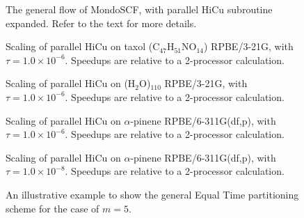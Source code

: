 \commentoutA{\documentclass[prl,aps,twocolumn,showpacs,twocolumngrid,superbib]{revtex4}}
\begin{document}
{\begin{figure}
\caption{The general flow of {\sc MondoSCF}, with parallel HiCu subroutine
expanded.  Refer to the text for more details.}
\label{fig:parahicu}
\end{figure}
 
\begin{figure}
\caption{Scaling of parallel HiCu on taxol (C$_{47}$H$_{51}$NO$_{14}$)
RPBE/3-21G, with $\tau = 1.0 \times 10^{-6}$. Speedups are relative to
a 2-processor calculation.}\label{fig:taxol}
\end{figure}

\begin{figure}
\caption{Scaling of parallel HiCu on (H$_2$O)$_{110}$ RPBE/3-21G, with
$\tau = 1.0 \times 10^{-6}$. Speedups are relative to a 2-processor
calculation.}\label{fig:waterscaling}
\end{figure}

\begin{figure}
\caption{Scaling of parallel HiCu on $\alpha$-pinene RPBE/6-311G(df,p), with
$\tau = 1.0 \times 10^{-6}$. Speedups are relative to a 2-processor
calculation.}\label{fig:good-thres-pinene}
\end{figure}

\begin{figure}
\caption{Scaling of parallel HiCu on $\alpha$-pinene RPBE/6-311G(df,p), with
$\tau = 1.0 \times 10^{-8}$. Speedups are relative to a 2-processor
calculation.}\label{fig:tight-thres-pinene}
\end{figure}

\begin{figure}
\caption{An illustrative example to show the general Equal Time 
partitioning scheme for the case of $m=5$.}\label{fig:binary}
\end{figure}

\pagebreak
\clearpage

}
\end{document}
